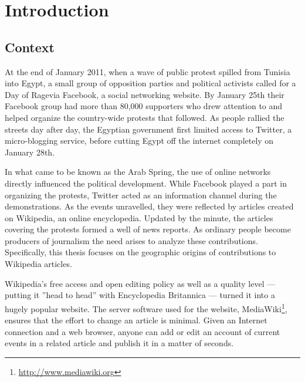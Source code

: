 \chapter{Introduction}\label{ch:introduction}


\section{Context}

At the end of January 2011, when a wave of public protest spilled from Tunisia into Egypt, a small group of opposition parties and political activists called for a \glqq Day of Rage\grqq via Facebook, a social networking website.
By January 25th their Facebook group had more than 80,000 supporters who drew attention to and helped organize the country-wide protests that followed. 
As people rallied the streets day after day, the Egyptian government first limited access to Twitter, a micro-blogging service, before cutting Egypt off the internet completely on January 28th.\cite{econ18013760, szegypt}

In what came to be known as the Arab Spring, the use of online networks directly influenced the political development.
While Facebook played a part in organizing the protests, Twitter acted as an information channel during the demonstrations.
As the events unravelled, they were reflected by articles created on Wikipedia, an online encyclopedia.
Updated by the minute, the articles covering the protests formed a well of news reports.\cite{wikiegypt}
As ordinary people become producers of journalism the need arises to analyze these contributions. 
Specifically, this thesis focuses on the geographic origins of contributions to Wikipedia articles.

Wikipedia's free access and open editing policy as well as a quality level --- putting it ''head to head''\cite{giles2005internet} with Encyclopedia Britannica --- turned it into a hugely popular website\cite{wikipv}.
The server software used for the website, MediaWiki\footnote{\url{http://www.mediawiki.org}}, ensures that the effort to change an article is minimal.
Given an Internet connection and a web browser, anyone can add or edit an account of current events in a related article and publish it in a matter of seconds.

